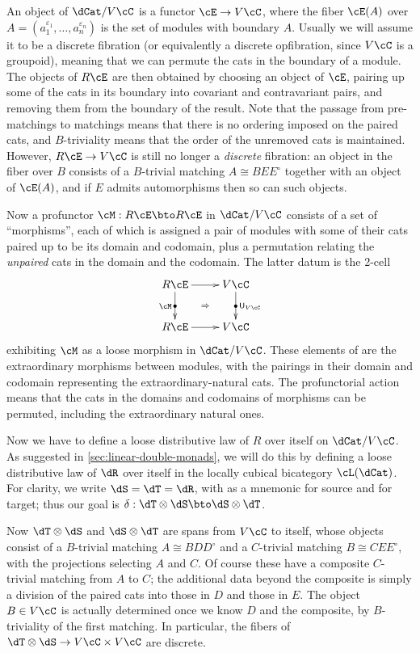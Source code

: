 \documentclass{amsart}
\let\ocomp\otimes
\newcommand{\C}{\cC}
\newcommand{\E}{\cE}
\newcommand{\hunit}[1]{\mathsf{U}_{#1}}
\newcommand{\dl}{\delta}
\renewcommand{\o}{^{\circ}}
\newcommand{\e}[1][]{^{\varepsilon_{#1}}}
\begin{document}
An object of $\dCat/V\C$ is a functor $\E\to V\C$, where the fiber $\E(A)$ over $A=(a_1\e[1],\dots,a_n\e[n])$ is the set of modules with boundary $A$.
Usually we will assume it to be a discrete fibration (or equivalently a discrete opfibration, since $V\C$ is a groupoid), meaning that we can permute the cats in the boundary of a module.
The objects of $R\E$ are then obtained by choosing an object of $\E$, pairing up some of the cats in its boundary into covariant and contravariant pairs, and removing them from the boundary of the result.
Note that the passage from pre-matchings to matchings means that there is no ordering imposed on the paired cats, and $B$-triviality means that the order of the unremoved cats is maintained.
However, $R\E\to V\C$ is still no longer a \emph{discrete} fibration: an object in the fiber over $B$ consists of a $B$-trivial matching $A\cong BEE\o$ together with an object of $\E(A)$, and if $E$ admits automorphisms then so can such objects.

Now a profunctor $\cM:R\E \bto R\E$ in $\dCat/V\C$ consists of a set of ``morphisms'', each of which is assigned a pair of modules with some of their cats paired up to be its domain and codomain, plus a permutation relating the \emph{unpaired} cats in the domain and the codomain.
The latter datum is the 2-cell
\[ \xymatrix{ R\E \ar[d]|{\bullet}_{\cM} \ar[r] \ar@{}[dr]|{\Rightarrow} & V\C \ar[d]|{\bullet}^{\hunit {V\C}} \\ R\E \ar[r] & V \C } \]
exhibiting $\cM$ as a loose morphism in $\dCat/V\C$.
These elements of \cM are the extraordinary morphisms between modules, with the pairings in their domain and codomain representing the extraordinary-natural cats.
The profunctorial action means that the cats in the domains and codomains of morphisms can be permuted, including the extraordinary natural ones.

Now we have to define a loose distributive law of $R$ over itself on $\dCat/V\C$.
As suggested in \cref{sec:linear-double-monads}, we will do this by defining a loose distributive law of $\dR$ over itself in the locally cubical bicategory $\cL(\dCat)$.
For clarity, we write $\dS=\dT=\dR$, with \dS as a mnemonic for source and \dT for target; thus our goal is $\dl : \dT \ocomp \dS \bto \dS \ocomp \dT$.

Now $\dT\ocomp \dS$ and $\dS\ocomp \dT$ are spans from $V\C$ to itself, whose objects consist of a $B$-trivial matching $A\cong B D D\o$ and a $C$-trivial matching $B \cong C E E\o$, with the projections selecting $A$ and $C$.
Of course these have a composite $C$-trivial matching from $A$ to $C$; the additional data beyond the composite is simply a division of the paired cats into those in $D$ and those in $E$.
The object $B\in V\C$ is actually determined once we know $D$ and the composite, by $B$-triviality of the first matching.
In particular, the fibers of $\dT\ocomp \dS \to V\C \times V\C$ are discrete.
\end{document}
